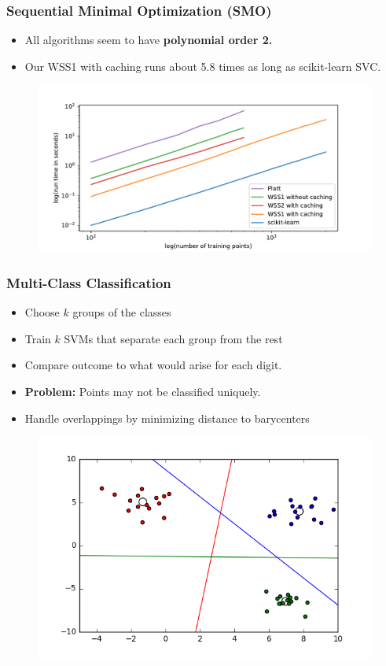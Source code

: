 \documentclass[12pt, compress]{beamer}
\newcommand{\titleC}{Sequential Minimal Optimization (SMO)}
\newcommand{\titleD}{Multi-Class Classification}
\begin{document}
\begin{frame}
\frametitle{\titleC}
\begin{itemize}
	\item All algorithms seem to have \textbf{\alert{polynomial order 2.}}
	\item Our WSS1 with caching runs about 5.8 times as long as scikit-learn SVC.
\end{itemize}
\begin{figure}[h]
	\includegraphics[width=1\textwidth]{images_for_presentation/benchplot_gauss_loglog.pdf}
\end{figure}
\end{frame}
          

\begin{frame}
  \frametitle{\titleD}
	\begin{itemize}
		\item Choose $k$ groups of the classes
		\item Train $k$ SVMs that separate each group from the rest
		\item Compare outcome to what would arise for each digit.
		\item \textbf{\alert{Problem:}} Points may not be classified uniquely.
		\item Handle overlappings by minimizing distance to barycenters
	\end{itemize}

	\begin{figure}[h]
		\includegraphics[width=.6\textwidth]{onevsall_examplegraphic}
	\end{figure}
\end{frame}
\end{document}
